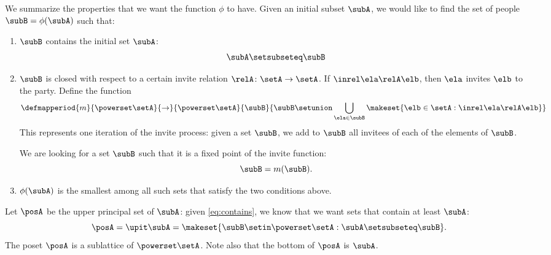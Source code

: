 We summarize the properties that we want the function $\phi$ to have.
Given an initial subset $\subA$, we would like to find the set of people $\subB = \phi(\subA)$ such that:
\begin{enumerate}
    \item $\subB$ contains the initial set $\subA$:
          \begin{equation}
              \label{eq:contains}
              \subA \setsubseteq \subB
          \end{equation}
    \item $\subB$ is closed with respect to a certain invite relation $\relA \colon \setA \to \setA$.
          If $\inrel \ela \relA \elb$, then $\ela$ invites $\elb$ to the party.
          Define the function
          \begin{equation}
              \defmapperiod{m}{\powerset \setA}{\to}{\powerset \setA
              }{
                  \subB
              }{
                  \subB \setunion \bigcup_{\ela \in \subB} \makeset{ \elb \in \setA : \inrel \ela \relA \elb}
              }
          \end{equation}
          This represents one iteration of the invite process: given a set $\subB$, we add to $\subB$ all invitees of each of the elements of $\subB$.

          We are looking for a set $\subB$ such that it is a fixed point of the invite function:
          \begin{equation}
              \subB = m(\subB).
          \end{equation}

    \item $\phi(\subA)$ is the smallest among all such sets that satisfy the two conditions above.
\end{enumerate}

Let $\posA$ be the upper principal set of $\subA$: given \cref{eq:contains}, we know that we want sets that contain at least $\subA$:
\begin{equation}
    \posA = \upit \subA  = \makeset{ \subB \setin \powerset \setA : \subA \setsubseteq \subB }.
\end{equation}
The poset $\posA$ is a sublattice of $\powerset \setA$.
Note also that the bottom of $\posA$ is $\subA$.

